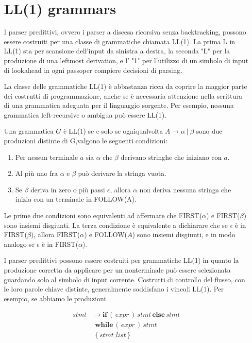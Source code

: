 \section{LL(1) grammars}
I parser predittivi, ovvero i parser a discesa ricorsiva senza backtracking, possono essere costruiti per una classe di grammatiche chiamata LL(1). La prima L in LL(1) sta per scansione dell'input da sinistra a destra, la seconda "L" per la produzione di una leftmost derivation, e l' "1" per l'utilizzo di un simbolo di input di lookahead in ogni passoper compiere decisioni di parsing.

La classe delle grammatiche LL(1) è abbastanza ricca da coprire la maggior parte dei costrutti di programmazione, anche se è necessaria attenzione nella scrittura di una grammatica adeguata per il linguaggio sorgente. Per esempio, nessuna grammatica left-recursive o ambigua può essere LL(1).

Una grammatica $G$ è LL(1) se e solo se ogniqualvolta $A \rightarrow \alpha \: | \: \beta$ sono due produzioni distinte di G,valgono le seguenti condizioni:
\begin{enumerate}
	\item Per nessun terminale $a$ sia $\alpha$ che $\beta$ derivano stringhe che iniziano con $a$.
	\item Al più uno fra $\alpha$ e $\beta$ può derivare la stringa vuota.
	\item Se $\beta$ deriva in zero o più passi $\epsilon$, allora $\alpha$ non deriva nessuna stringa che inizia con un terminale in FOLLOW(A).
\end{enumerate}
Le prime due condizioni sono equivalenti ad affermare che FIRST($\alpha$) e FIRST($\beta$) sono insiemi disgiunti. La terza condizione è equivalente a dichiarare che se $\epsilon$ è in FIRST($\beta$), allora FIRST($\alpha$) e FOLLOW($A$) sono insiemi disgiunti, e in modo analogo se $\epsilon$ è in  FIRST($\alpha$).

I parser predittivi possono essere costruiti per grammatiche LL(1) in quanto la produzione corretta da applicare per un nonterminale può essere selezionata guardando solo al simbolo di input corrente. Costrutti di controllo del flusso, con le loro parole chiave distinte, generalmente soddisfano i vincoli LL(1). Per esempio, se abbiamo le produzioni

\begin{align*}
	stmt &\rightarrow \textbf{if} \, ( \, expr \, ) \, stmt \, \textbf{else} \, stmt \\
	\! &| \, \textbf{while} \, ( \, expr \, ) \, stmt \\
	\! &| \, \{ \, stmt\_list \, \}
\end{align*}

